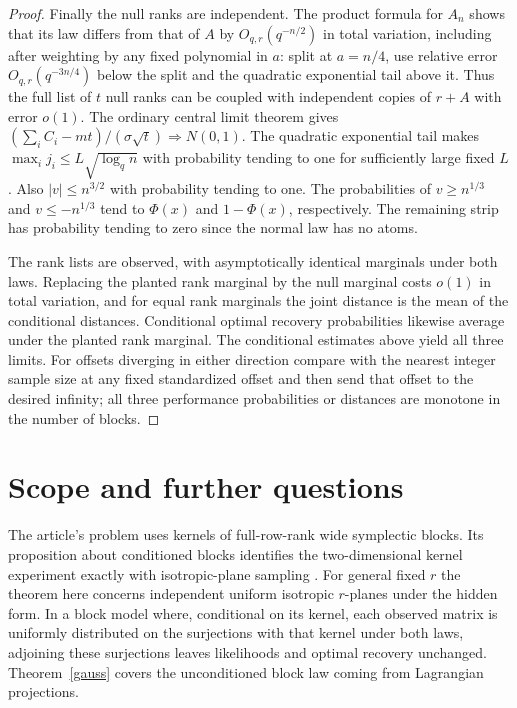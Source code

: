 \documentclass[11pt]{article}
\begin{document}
\begin{proof}
Finally the null ranks are independent. The product formula for $A_n$ shows that its law differs from that of $A$ by $O_{q,r}(q^{-n/2})$ in total variation, including after weighting by any fixed polynomial in $a$: split at $a=n/4$, use relative error $O_{q,r}(q^{-3n/4})$ below the split and the quadratic exponential tail above it. Thus the full list of $t$ null ranks can be coupled with independent copies of $r+A$ with error $o(1)$. The ordinary central limit theorem gives $(\sum_i C_i-mt)/(\sigma\sqrt t)\Rightarrow N(0,1)$. The quadratic exponential tail makes $\max_i j_i\le L\sqrt{\log_q n}$ with probability tending to one for sufficiently large fixed $L$. Also $|v|\le n^{3/2}$ with probability tending to one. The probabilities of $v\ge n^{1/3}$ and $v\le-n^{1/3}$ tend to $\Phi(x)$ and $1-\Phi(x)$, respectively. The remaining strip has probability tending to zero since the normal law has no atoms.

The rank lists are observed, with asymptotically identical marginals under both laws. Replacing the planted rank marginal by the null marginal costs $o(1)$ in total variation, and for equal rank marginals the joint distance is the mean of the conditional distances. Conditional optimal recovery probabilities likewise average under the planted rank marginal. The conditional estimates above yield all three limits. For offsets diverging in either direction compare with the nearest integer sample size at any fixed standardized offset and then send that offset to the desired infinity; all three performance probabilities or distances are monotone in the number of blocks.
\end{proof}

\section{Scope and further questions}
The article's problem uses kernels of full-row-rank wide symplectic blocks. Its proposition about conditioned blocks identifies the two-dimensional kernel experiment exactly with isotropic-plane sampling \cite{repo}. For general fixed $r$ the theorem here concerns independent uniform isotropic $r$-planes under the hidden form. In a block model where, conditional on its kernel, each observed matrix is uniformly distributed on the surjections with that kernel under both laws, adjoining these surjections leaves likelihoods and optimal recovery unchanged. Theorem~\ref{gauss} covers the unconditioned block law coming from Lagrangian projections.
\end{document}
